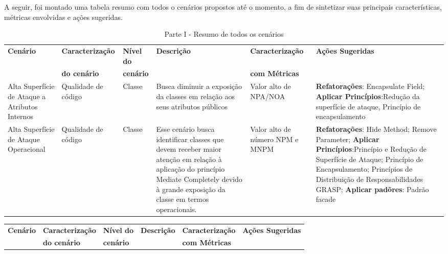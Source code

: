 A seguir, foi montado uma tabela resumo com todos o cenários propostos até o momento, a fim de sintetizar suas principais características, métricas envolvidas e ações sugeridas.


\begin{landscape}

	\begin{table}[H]
		\begin{center}
	    \begin{tabular}{ |p{}| p{3cm} | p{2cm} | p{5cm} | p{5cm}  | p{5cm}  |}
	    \hline
	    \textbf{Cenário} & \textbf{Caracterização} & \textbf{Nível do} & \textbf{Descrição} & \textbf{Caracterização} & \textbf{Ações Sugeridas} \\
	      & \textbf{do cenário} & \textbf{cenário} &  & \textbf{com Métricas} & \\ 	\hline
	    Alta Superfície de Ataque a Atributos Internos & Qualidade de código & Classe & Busca diminuir a exposição da classes em relação aos seus atributos públicos & Valor alto de NPA/NOA &  \textbf{Refatorações}: Encapsulate Field; \textbf{Aplicar Princípios}:Redução da superfície de ataque, Princípio de encapsulamento \\ \hline

	    Alta Superfície de Ataque Operacional & Qualidade de código & Classe & Esse cenário busca identificar classes que devem receber maior atenção em relação à aplicação do princípio Mediate Completely devido à grande exposição da classe em termos operacionais.& Valor alto de número NPM e MNPM & \textbf{Refatorações}: Hide Method; Remove Parameter; \textbf{Aplicar Princípios}:Princípio e Redução de Superfície de Ataque;
Princípio de Encapsulamento; Princípios de Distribuição de Responsabilidades GRASP; \textbf{Aplicar padõres}: Padrão facade\\ \hline

	    \end{tabular}
		    \caption{Parte I - Resumo de todos os cenários}
		    \label{tab:resumoI}
		\end{center}
	\end{table}

	\begin{table}[H]
		\begin{center}
	    \begin{tabular}{ |p{}| p{3cm} | p{2cm} | p{5cm} | p{5cm}  | p{5cm}  |}
	    \hline
	    \textbf{Cenário} & \textbf{Caracterização} & \textbf{Nível do} & \textbf{Descrição} & \textbf{Caracterização} & \textbf{Ações Sugeridas} \\
	      & \textbf{do cenário} & \textbf{cenário} &  & \textbf{com Métricas} & \\ 	\hline
	    

\end{tabular}
\end{center}
\end{table}
\end{landscape}
